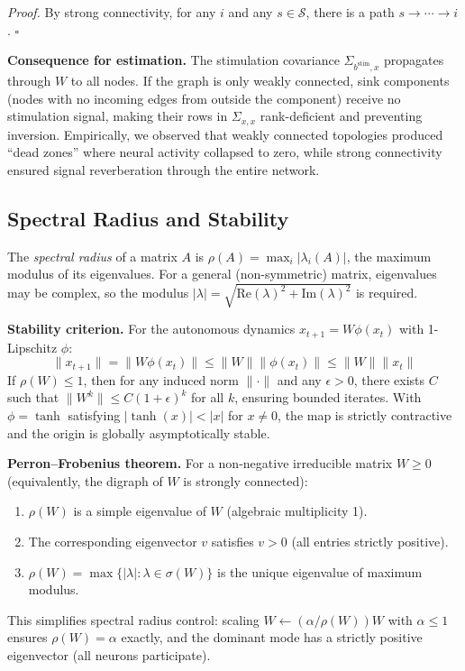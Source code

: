 \documentclass{article}
\begin{document}
\emph{Proof.} By strong connectivity, for any $i$ and any $s \in \mathcal{S}$, there is a path $s \to \cdots \to i$. $\square$

\textbf{Consequence for estimation.} The stimulation covariance $\Sigma_{b^{\text{stim}}, x}$ propagates through $W$ to all nodes.
If the graph is only weakly connected, sink components (nodes with no incoming edges from outside the component) receive no stimulation signal, making their rows in $\Sigma_{x,x}$ rank-deficient and preventing inversion.
Empirically, we observed that weakly connected topologies produced ``dead zones'' where neural activity collapsed to zero, while strong connectivity ensured signal reverberation through the entire network.

\subsection{Spectral Radius and Stability}
\label{sec:app_spectral}

The \emph{spectral radius} of a matrix $A$ is $\rho(A) = \max_i |\lambda_i(A)|$, the maximum modulus of its eigenvalues.
For a general (non-symmetric) matrix, eigenvalues may be complex, so the modulus $|\lambda| = \sqrt{\text{Re}(\lambda)^2 + \text{Im}(\lambda)^2}$ is required.

\textbf{Stability criterion.} For the autonomous dynamics $x_{t+1} = W\phi(x_t)$ with 1-Lipschitz $\phi$:
\[
\|x_{t+1}\| = \|W\phi(x_t)\| \leq \|W\| \|\phi(x_t)\| \leq \|W\| \|x_t\|
\]
If $\rho(W) \leq 1$, then for any induced norm $\|\cdot\|$ and any $\epsilon > 0$, there exists $C$ such that $\|W^k\| \leq C(1+\epsilon)^k$ for all $k$, ensuring bounded iterates.
With $\phi = \tanh$ satisfying $|\tanh(x)| < |x|$ for $x \neq 0$, the map is strictly contractive and the origin is globally asymptotically stable.

\textbf{Perron--Frobenius theorem.} For a non-negative irreducible matrix $W \geq 0$ (equivalently, the digraph of $W$ is strongly connected):
\begin{enumerate}
    \item $\rho(W)$ is a simple eigenvalue of $W$ (algebraic multiplicity 1).
    \item The corresponding eigenvector $v$ satisfies $v > 0$ (all entries strictly positive).
    \item $\rho(W) = \max\{|\lambda| : \lambda \in \sigma(W)\}$ is the unique eigenvalue of maximum modulus.
\end{enumerate}
This simplifies spectral radius control: scaling $W \leftarrow (\alpha / \rho(W)) W$ with $\alpha \leq 1$ ensures $\rho(W) = \alpha$ exactly, and the dominant mode has a strictly positive eigenvector (all neurons participate).
\end{document}
